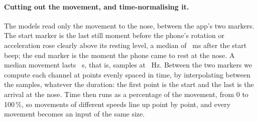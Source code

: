 \paragraph{Cutting out the movement, and time-normalising it.} The models read only the movement to the nose, between
the app's two markers. The start marker is the last still moment before the phone's rotation or acceleration rose
clearly above its resting level, a median of ~ms after the start beep; the end marker is
the moment the phone came to rest at the nose. A median movement lasts ~s, that is,
 samples at ~Hz. Between the two markers we compute each channel
at  points evenly spaced in time, by interpolating between the samples, whatever the duration: the
first point is the start and the last is the arrival at the nose. Time then runs as a percentage of the movement,
from 0 to 100\,\%, so movements of different speeds line up point by point, and every movement becomes an input of
the same size.
